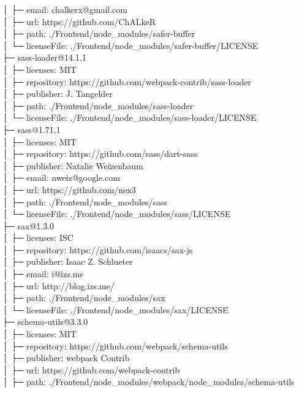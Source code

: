 \documentclass[
    paper=a4,
    twoside=false,
    parskip=half,
    listof=entryprefix,
    listof=totoc,
    index=totoc,
    bibliography=totoc,
    headsepline,
]{scrbook}
\begin{document}
    │  ├─ email: chalkerx@gmail.com\\
    │  ├─ url: https://github.com/ChALkeR\\
    │  ├─ path: ./Frontend/node\_modules/safer-buffer\\
    │  └─ licenseFile: ./Frontend/node\_modules/safer-buffer/LICENSE\\
    ├─ sass-loader@14.1.1\\
    │  ├─ licenses: MIT\\
    │  ├─ repository: https://github.com/webpack-contrib/sass-loader\\
    │  ├─ publisher: J. Tangelder\\
    │  ├─ path: ./Frontend/node\_modules/sass-loader\\
    │  └─ licenseFile: ./Frontend/node\_modules/sass-loader/LICENSE\\
    ├─ sass@1.71.1\\
    │  ├─ licenses: MIT\\
    │  ├─ repository: https://github.com/sass/dart-sass\\
    │  ├─ publisher: Natalie Weizenbaum\\
    │  ├─ email: nweiz@google.com\\
    │  ├─ url: https://github.com/nex3\\
    │  ├─ path: ./Frontend/node\_modules/sass\\
    │  └─ licenseFile: ./Frontend/node\_modules/sass/LICENSE\\
    ├─ sax@1.3.0\\
    │  ├─ licenses: ISC\\
    │  ├─ repository: https://github.com/isaacs/sax-js\\
    │  ├─ publisher: Isaac Z. Schlueter\\
    │  ├─ email: i@izs.me\\
    │  ├─ url: http://blog.izs.me/\\
    │  ├─ path: ./Frontend/node\_modules/sax\\
    │  └─ licenseFile: ./Frontend/node\_modules/sax/LICENSE\\
    ├─ schema-utils@3.3.0\\
    │  ├─ licenses: MIT\\
    │  ├─ repository: https://github.com/webpack/schema-utils\\
    │  ├─ publisher: webpack Contrib\\
    │  ├─ url: https://github.com/webpack-contrib\\
    │  ├─ path: ./Frontend/node\_modules/webpack/node\_modules/schema-utils\\
\end{document}
